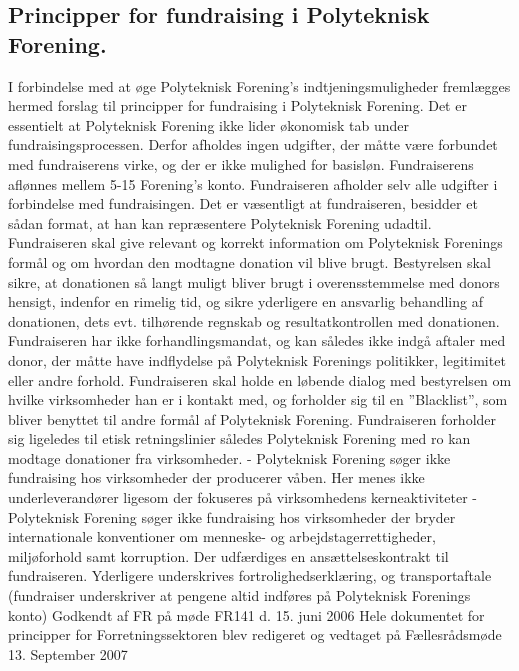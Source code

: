 \subsection{Principper for fundraising i Polyteknisk Forening.}
I forbindelse med at øge Polyteknisk Forening’s indtjeningsmuligheder fremlægges hermed forslag til principper for
fundraising i Polyteknisk Forening.
Det er essentielt at Polyteknisk Forening ikke lider økonomisk tab under fundraisingsprocessen. Derfor afholdes ingen
udgifter, der måtte være forbundet med fundraiserens virke, og der er ikke mulighed for basisløn. Fundraiserens
aflønnes mellem 5-15 %
Forening’s konto. Fundraiseren afholder selv alle udgifter i forbindelse med fundraisingen.
Det er væsentligt at fundraiseren, besidder et sådan format, at han kan repræsentere Polyteknisk Forening udadtil.
Fundraiseren skal give relevant og korrekt information om Polyteknisk Forenings formål og om hvordan den modtagne
donation vil blive brugt. Bestyrelsen skal sikre, at donationen så langt muligt bliver brugt i overensstemmelse med
donors hensigt, indenfor en rimelig tid, og sikre yderligere en ansvarlig behandling af donationen, dets evt. tilhørende
regnskab og resultatkontrollen med donationen.
Fundraiseren har ikke forhandlingsmandat, og kan således ikke indgå aftaler med donor, der måtte have indflydelse på
Polyteknisk Forenings politikker, legitimitet eller andre forhold.
Fundraiseren skal holde en løbende dialog med bestyrelsen om hvilke virksomheder han er i kontakt med, og forholder
sig til en ”Blacklist”, som bliver benyttet til andre formål af Polyteknisk Forening.
Fundraiseren forholder sig ligeledes til etisk retningslinier således Polyteknisk Forening med ro kan modtage donationer
fra virksomheder.
- Polyteknisk Forening søger ikke fundraising hos virksomheder der producerer våben. Her menes ikke
underleverandører ligesom der fokuseres på virksomhedens kerneaktiviteter
- Polyteknisk Forening søger ikke fundraising hos virksomheder der bryder internationale konventioner om
menneske- og arbejdstagerrettigheder, miljøforhold samt korruption.
Der udfærdiges en ansættelseskontrakt til fundraiseren. Yderligere underskrives fortrolighedserklæring, og
transportaftale (fundraiser underskriver at pengene altid indføres på Polyteknisk Forenings konto)
Godkendt af FR på møde FR141 d. 15. juni 2006
Hele dokumentet for principper for Forretningssektoren blev redigeret og vedtaget på Fællesrådsmøde 13. September
2007
